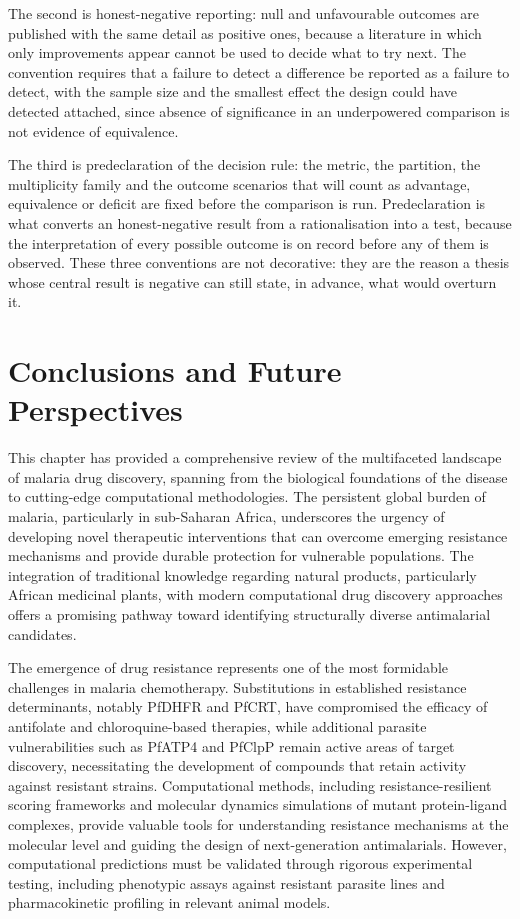 The second is honest-negative reporting: null and unfavourable outcomes are published with the same detail as positive ones, because a literature in which only improvements appear cannot be used to decide what to try next. The convention requires that a failure to detect a difference be reported as a failure to detect, with the sample size and the smallest effect the design could have detected attached, since absence of significance in an underpowered comparison is not evidence of equivalence.

The third is predeclaration of the decision rule: the metric, the partition, the multiplicity family and the outcome scenarios that will count as advantage, equivalence or deficit are fixed before the comparison is run. Predeclaration is what converts an honest-negative result from a rationalisation into a test, because the interpretation of every possible outcome is on record before any of them is observed. These three conventions are not decorative: they are the reason a thesis whose central result is negative can still state, in advance, what would overturn it.

\section{Conclusions and Future Perspectives}

This chapter has provided a comprehensive review of the multifaceted landscape of malaria drug discovery, spanning from the biological foundations of the disease to cutting-edge computational methodologies. The persistent global burden of malaria, particularly in sub-Saharan Africa, underscores the urgency of developing novel therapeutic interventions that can overcome emerging resistance mechanisms and provide durable protection for vulnerable populations. The integration of traditional knowledge regarding natural products, particularly African medicinal plants, with modern computational drug discovery approaches offers a promising pathway toward identifying structurally diverse antimalarial candidates.

The emergence of drug resistance represents one of the most formidable challenges in malaria chemotherapy. Substitutions in established resistance determinants, notably PfDHFR and PfCRT, have compromised the efficacy of antifolate and chloroquine-based therapies, while additional parasite vulnerabilities such as PfATP4 and PfClpP remain active areas of target discovery, necessitating the development of compounds that retain activity against resistant strains. Computational methods, including resistance-resilient scoring frameworks and molecular dynamics simulations of mutant protein-ligand complexes, provide valuable tools for understanding resistance mechanisms at the molecular level and guiding the design of next-generation antimalarials. However, computational predictions must be validated through rigorous experimental testing, including phenotypic assays against resistant parasite lines and pharmacokinetic profiling in relevant animal models.

